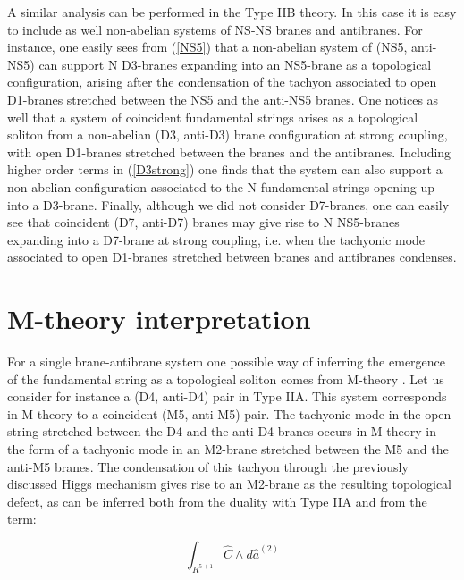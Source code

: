 \documentclass[12pt,a4paper]{article}
\begin{document}
A similar analysis can be performed in the Type IIB theory.
In this case it is easy to include as well non-abelian systems of 
NS-NS branes and antibranes. For instance, one easily sees from
(\ref{NS5}) that a non-abelian system of (NS5, anti-NS5) can
support N D3-branes expanding into an NS5-brane as a topological
configuration, arising after the condensation of the tachyon associated
to open D1-branes stretched between the NS5 and the anti-NS5 branes.
One notices as well that a system of coincident fundamental strings
arises as a topological soliton from a non-abelian (D3, anti-D3) brane
configuration at strong coupling, 
with open D1-branes stretched between the branes and the antibranes.
Including higher order terms in (\ref{D3strong}) one finds that
the system can also support a non-abelian configuration associated
to the N fundamental strings opening up into a D3-brane.  
Finally, although we did not consider D7-branes, one can easily
see that coincident (D7, anti-D7) branes may give rise to N
NS5-branes expanding into a D7-brane at strong coupling, i.e. when
the tachyonic mode associated to open D1-branes stretched between
branes and antibranes condenses. 


\section{M-theory interpretation}

For a single brane-antibrane system one possible way of inferring 
the emergence of the fundamental string as a topological soliton
comes from M-theory \cite{Yi,HL1}. Let us consider for instance
a (D4, anti-D4) pair in Type IIA. This system corresponds in M-theory
to a coincident (M5, anti-M5) pair. 
The tachyonic mode in the
open string stretched between the D4 and the anti-D4 branes occurs
in M-theory in the form of a tachyonic mode in an M2-brane stretched 
between the M5 and the anti-M5 branes.
The condensation of this tachyon through the previously discussed
Higgs mechanism
gives rise to an
M2-brane as the resulting topological defect, as can be inferred both
from the duality with Type IIA and from the term:

\begin{equation}
\int_{R^{5+1}}{\hat C}\wedge d{\hat a}^{(2)}
\end{equation}
\end{document}
